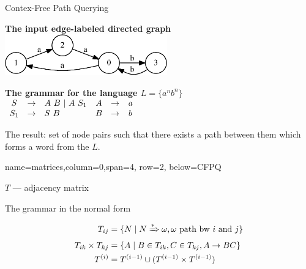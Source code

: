 \documentclass[a0paper,portrait]{baposter}
\begin{document}
\begin{poster}
\begin{posterbox}[name=CFPQ,column=0,row=0, span=4]{Contex-Free Path Querying}

  \begin{center}
  	\textbf{The input edge-labeled directed graph}
  	\includegraphics[width=7cm]{example_graph_transparent.png}

  	\textbf{The grammar for the language $L=\{a^n b^n\}$}\\
  	$\begin{array}{cclccl}
  	S & \rightarrow & A \ B \ | \ A \ S_1 & A & \rightarrow & \text{\emph{a}} \\
  	S_1 & \rightarrow & S \ B & B & \rightarrow & \text{\emph{b}} \\


  	\end{array}$
  \end{center}

  The result: set of node pairs such that there exists a path between them which forms a word from the $L$.

\end{posterbox}

{name=matrices,column=0,span=4, row=2, below=CFPQ}%
{

\begin{center}


$T$ --- adjacency matrix

The grammar in the normal form

\begin{align*}
T_{ij} &=\{ N \mid N \xRightarrow[]{*} \omega,  \omega \text{ path bw } i \text{ and } j \} \\
T_{ik} \times T_{kj} &= \{ A \mid B \in T_{ik}, C \in T_{kj}, A \rightarrow B C \} \\
T^{(i)} &= T^{(i-1)} \cup (T^{(i-1)} \times T^{(i-1)})
\end{align*}



\end{center}}
\end{poster}
\end{document}
